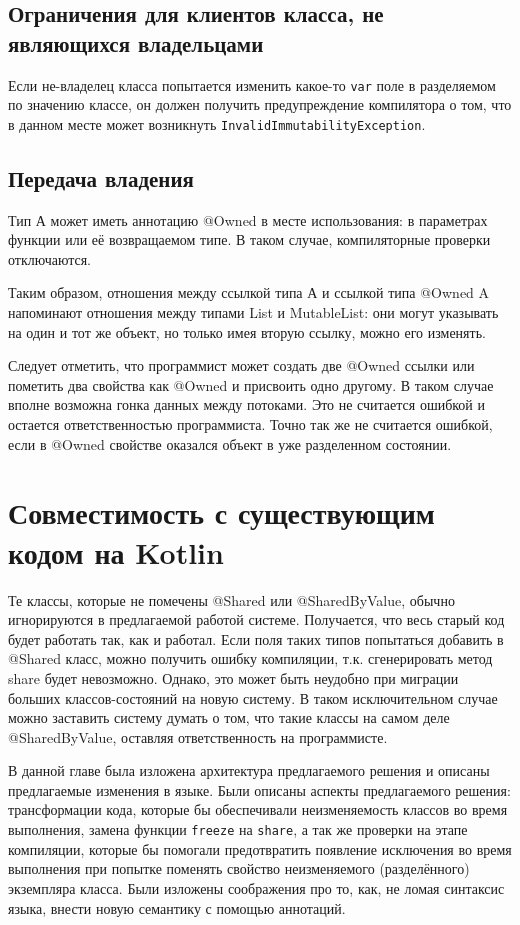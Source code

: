 \documentclass[specification,annotation,times]{itmo-student-thesis}
\begin{document}
\subsection{Ограничения для клиентов класса, не являющихся владельцами}

Если не-владелец класса попытается изменить какое-то \texttt{var} поле в разделяемом по значению классе, он должен получить предупреждение компилятора о том, что в данном месте может возникнуть \texttt{InvalidImmutabilityException}.

\subsection{Передача владения}

Тип А может иметь аннотацию @Owned в месте использования: в параметрах функции или её возвращаемом типе. В таком случае, компиляторные проверки отключаются.

Таким образом, отношения между ссылкой типа А и ссылкой типа @Owned A напоминают отношения между типами List и MutableList: они могут указывать на один и тот же объект, но только имея вторую ссылку, можно его изменять.

Следует отметить, что программист может создать две @Owned ссылки или пометить два свойства как @Owned и присвоить одно другому. В таком случае вполне возможна гонка данных между потоками. Это не считается ошибкой и остается ответственностью программиста.
Точно так же не считается ошибкой, если в @Owned свойстве оказался объект в уже разделенном состоянии.

\section{Совместимость с существующим кодом на Kotlin}\label{backwards_compat}

Те классы, которые не помечены @Shared или @SharedByValue, обычно игнорируются в предлагаемой работой системе.
Получается, что весь старый код будет работать так, как и работал.
Если поля таких типов попытаться добавить в @Shared класс, можно получить ошибку компиляции, т.к. сгенерировать метод share будет невозможно.
Однако, это может быть неудобно при миграции больших классов-состояний на новую систему.
В таком исключительном случае можно заставить систему думать о том, что такие классы на самом деле @SharedByValue, оставляя ответственность на программисте.

\chapterconclusion

В данной главе была изложена архитектура предлагаемого решения и описаны предлагаемые изменения в языке.
Были описаны аспекты предлагаемого решения: трансформации кода, которые бы обеспечивали неизменяемость классов во время выполнения, замена функции \texttt{freeze} на \texttt{share}, а так же проверки на этапе компиляции, которые бы помогали предотвратить появление исключения во время выполнения при попытке поменять свойство неизменяемого (разделённого) экземпляра класса.
Были изложены соображения про то, как, не ломая синтаксис языка, внести новую семантику с помощью аннотаций.
\end{document}
